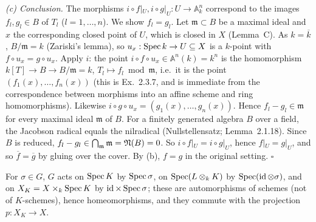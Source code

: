 \documentclass[11pt]{article}
\begin{document}
\emph{(c) Conclusion.} The morphisms $i\circ f|_U,i\circ g|_U:U\to\mathbb A^n_k$ correspond to the images $f_l,g_l\in B$ of $T_l$ ($l=1,\dots,n$). We show $f_l=g_l$. Let $\mathfrak m\subset B$ be a maximal ideal and $x$ the corresponding closed point of $U$, which is closed in $X$ (Lemma~C). As $k=\overline k$, $B/\mathfrak m=k$ (Zariski's lemma), so $u_x:\operatorname{Spec} k\to U\subseteq X$ is a $k$-point with $f\circ u_x=g\circ u_x$. Apply $i$: the point $i\circ f\circ u_x\in\mathbb A^n(k)=k^n$ is the homomorphism $k[T]\to B\to B/\mathfrak m=k$, $T_l\mapsto f_l\bmod\mathfrak m$, i.e.\ it is the point $(f_1(x),\dots,f_n(x))$ (this is Ex.~2.3.7, and is immediate from the correspondence between morphisms into an affine scheme and ring homomorphisms). Likewise $i\circ g\circ u_x=(g_1(x),\dots,g_n(x))$. Hence $f_l-g_l\in\mathfrak m$ for every maximal ideal $\mathfrak m$ of $B$. For a finitely generated algebra $B$ over a field, the Jacobson radical equals the nilradical (Nullstellensatz; Lemma~2.1.18). Since $B$ is reduced, $f_l-g_l\in\bigcap_{\mathfrak m}\mathfrak m=\mathfrak N(B)=0$. So $i\circ f|_U=i\circ g|_U$, hence $f|_U=g|_U$, and so $\overline f=\overline g$ by gluing over the cover. By (b), $f=g$ in the original setting. \hfill$\square$

\pf
For $\sigma\in G$, $G$ acts on $\operatorname{Spec} K$ by $\operatorname{Spec}\sigma$, on $\operatorname{Spec}(L\otimes_kK)$ by $\operatorname{Spec}(\operatorname{id}\otimes\sigma)$, and on $X_K=X\times_k\operatorname{Spec} K$ by $\operatorname{id}\times\operatorname{Spec}\sigma$; these are automorphisms of schemes (not of $K$-schemes), hence homeomorphisms, and they commute with the projection $p:X_K\to X$.
\end{document}
